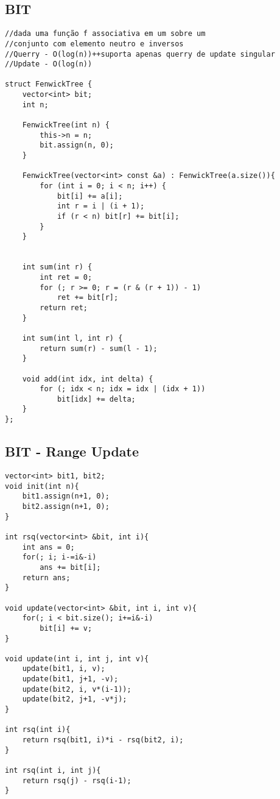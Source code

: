 \documentclass[11pt, a4paper, twoside]{article}
\begin{document}
\subsection{BIT}
\begin{verbatim}
//dada uma função f associativa em um sobre um
//conjunto com elemento neutro e inversos
//Querry - O(log(n))++suporta apenas querry de update singular
//Update - O(log(n))

struct FenwickTree {
    vector<int> bit; 
    int n;
    
    FenwickTree(int n) {
        this->n = n;
        bit.assign(n, 0);
    }
    
    FenwickTree(vector<int> const &a) : FenwickTree(a.size()){
        for (int i = 0; i < n; i++) {
            bit[i] += a[i];
            int r = i | (i + 1);
            if (r < n) bit[r] += bit[i];
        }
    }
    
    
    int sum(int r) {
        int ret = 0;
        for (; r >= 0; r = (r & (r + 1)) - 1)
            ret += bit[r];
        return ret;
    }
    
    int sum(int l, int r) {
        return sum(r) - sum(l - 1);
    }
    
    void add(int idx, int delta) {
        for (; idx < n; idx = idx | (idx + 1))
            bit[idx] += delta;
    }
};
\end{verbatim}

\subsection{BIT - Range Update}
\begin{verbatim}
vector<int> bit1, bit2;
void init(int n){
	bit1.assign(n+1, 0);
	bit2.assign(n+1, 0);
}

int rsq(vector<int> &bit, int i){
	int ans = 0;
	for(; i; i-=i&-i)
		ans += bit[i];
	return ans;
}

void update(vector<int> &bit, int i, int v){
	for(; i < bit.size(); i+=i&-i)
		bit[i] += v;
}

void update(int i, int j, int v){
	update(bit1, i, v);
	update(bit1, j+1, -v);
	update(bit2, i, v*(i-1));
	update(bit2, j+1, -v*j);	
}

int rsq(int i){
	return rsq(bit1, i)*i - rsq(bit2, i);
}

int rsq(int i, int j){
	return rsq(j) - rsq(i-1);
}
\end{verbatim}
\end{document}
